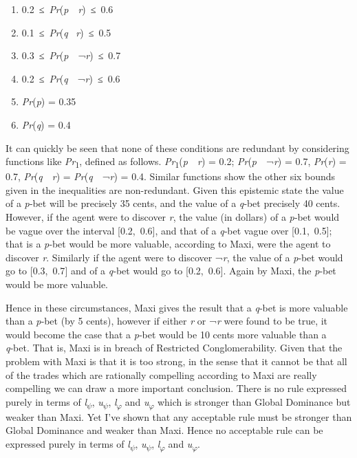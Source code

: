 \begin{enumerate}
\renewcommand{\theenumi}{(\roman{enumi})}
\item 0.2~≤~\emph{Pr}(\emph{p}~\textbar{}~\emph{r})~≤~0.6
\item 0.1~≤~\emph{Pr}(\emph{q}~\textbar{} \emph{r})~≤~0.5
\item 0.3~≤~\emph{Pr}(\emph{p}~\textbar{}~¬\emph{r})~≤~0.7
\item 0.2~≤~\emph{Pr}(\emph{q}~\textbar{}~¬\emph{r})~≤~0.6
\item \emph{Pr}(\emph{p}) = 0.35
\item  \emph{Pr}(\emph{q}) = 0.4
\end{enumerate}
It can quickly be seen that none of these conditions are redundant by
considering functions like \emph{Pr}\textsubscript{1}, defined as
follows. \emph{Pr}\textsubscript{1}(\emph{p}~\textbar{}~\emph{r}) = 0.2;
\emph{Pr}(\emph{p}~\textbar{}~¬\emph{r}) = 0.7, \emph{Pr}(\emph{r}) =
0.7, \emph{Pr}(\emph{q}~\textbar{}~\emph{r}) =
\emph{Pr}(\emph{q}~\textbar{}~¬\emph{r}) = 0.4. Similar functions show
the other six bounds given in the inequalities are non-redundant. Given
this epistemic state the value of a \emph{p}‑bet will be precisely 35
cents, and the value of a \emph{q}‑bet precisely 40 cents. However, if
the agent were to discover \emph{r}, the value (in dollars) of a
\emph{p}‑bet would be vague over the interval {[}0.2,~0.6{]}, and that
of a \emph{q}‑bet vague over {[}0.1,~0.5{]}; that is a \emph{p}‑bet
would be more valuable, according to Maxi, were the agent to discover
\emph{r}. Similarly if the agent were to discover ¬\emph{r}, the value
of a \emph{p}‑bet would go to {[}0.3,~0.7{]} and of a \emph{q}‑bet would
go to {[}0.2,~0.6{]}. Again by Maxi, the \emph{p}‑bet would be more
valuable.

Hence in these circumstances, Maxi gives the result that a \emph{q}‑bet
is more valuable than a \emph{p}‑bet (by 5 cents), however if either
\emph{r} or ¬\emph{r} were found to be true, it would become the case
that a \emph{p}‑bet would be 10 cents more valuable than a \emph{q}‑bet.
That is, Maxi is in breach of Restricted Conglomerability. Given that
the problem with Maxi is that it is too strong, in the sense that it
cannot be that all of the trades which are rationally compelling
according to Maxi are really compelling we can draw a more important
conclusion. There is no rule expressed purely in terms of
\emph{l}\textsubscript{$\psi$}, \emph{u}\textsubscript{$\psi$},
\emph{l}\textsubscript{$\varphi$} and \emph{u}\textsubscript{$\varphi$} which is
stronger than Global Dominance but weaker than Maxi. Yet I've shown that
any acceptable rule must be stronger than Global Dominance and weaker
than Maxi. Hence no acceptable rule can be expressed purely in terms of
\emph{l}\textsubscript{$\psi$}, \emph{u}\textsubscript{$\psi$},
\emph{l}\textsubscript{$\varphi$} and \emph{u}\textsubscript{$\varphi$}.

